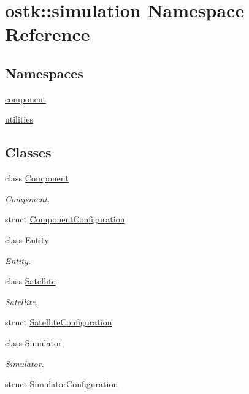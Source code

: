 \hypertarget{namespaceostk_1_1simulation}{}\section{ostk\+:\+:simulation Namespace Reference}
\label{namespaceostk_1_1simulation}
\subsection*{Namespaces}
\begin{DoxyCompactItemize}
\item 
 \hyperlink{namespaceostk_1_1simulation_1_1component}{component}
\item 
 \hyperlink{namespaceostk_1_1simulation_1_1utilities}{utilities}
\end{DoxyCompactItemize}
\subsection*{Classes}
\begin{DoxyCompactItemize}
\item 
class \hyperlink{classostk_1_1simulation_1_1_component}{Component}
\begin{DoxyCompactList}\small\item\em \hyperlink{classostk_1_1simulation_1_1_component}{Component}. \end{DoxyCompactList}\item 
struct \hyperlink{structostk_1_1simulation_1_1_component_configuration}{Component\+Configuration}
\item 
class \hyperlink{classostk_1_1simulation_1_1_entity}{Entity}
\begin{DoxyCompactList}\small\item\em \hyperlink{classostk_1_1simulation_1_1_entity}{Entity}. \end{DoxyCompactList}\item 
class \hyperlink{classostk_1_1simulation_1_1_satellite}{Satellite}
\begin{DoxyCompactList}\small\item\em \hyperlink{classostk_1_1simulation_1_1_satellite}{Satellite}. \end{DoxyCompactList}\item 
struct \hyperlink{structostk_1_1simulation_1_1_satellite_configuration}{Satellite\+Configuration}
\item 
class \hyperlink{classostk_1_1simulation_1_1_simulator}{Simulator}
\begin{DoxyCompactList}\small\item\em \hyperlink{classostk_1_1simulation_1_1_simulator}{Simulator}. \end{DoxyCompactList}\item 
struct \hyperlink{structostk_1_1simulation_1_1_simulator_configuration}{Simulator\+Configuration}
\end{DoxyCompactItemize}

